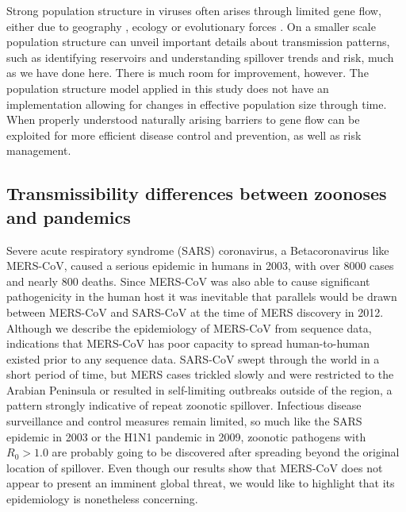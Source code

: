 \documentclass[9pt,lineno]{elife}
\begin{document}
Strong population structure in viruses often arises through limited gene flow, either due to geography \citep{dudas_virus_2017}, ecology \citep{smith_dating_2009} or evolutionary forces \citep{turner_genomic_2005,dudas_reassortment_2015}.
On a smaller scale population structure can unveil important details about transmission patterns, such as identifying reservoirs and understanding spillover trends and risk, much as we have done here.
There is much room for improvement, however.
The population structure model applied in this study does not have an implementation allowing for changes in effective population size through time.
When properly understood naturally arising barriers to gene flow can be exploited for more efficient disease control and prevention, as well as risk management.


\subsection*{Transmissibility differences between zoonoses and pandemics}
Severe acute respiratory syndrome (SARS) coronavirus, a Betacoronavirus like MERS-CoV, caused a serious epidemic in humans in 2003, with over 8000 cases and nearly 800 deaths.
Since MERS-CoV was also able to cause significant pathogenicity in the human host it was inevitable that parallels would be drawn between MERS-CoV and SARS-CoV at the time of MERS discovery in 2012.
Although we describe the epidemiology of MERS-CoV from sequence data, indications that MERS-CoV has poor capacity to spread human-to-human existed prior to any sequence data.
SARS-CoV swept through the world in a short period of time, but MERS cases trickled slowly and were restricted to the Arabian Peninsula or resulted in self-limiting outbreaks outside of the region, a pattern strongly indicative of repeat zoonotic spillover.
Infectious disease surveillance and control measures remain limited, so much like the SARS epidemic in 2003 or the H1N1 pandemic in 2009, zoonotic pathogens with $R_{0}>1.0$ are probably going to be discovered after spreading beyond the original location of spillover.
Even though our results show that MERS-CoV does not appear to present an imminent global threat, we would like to highlight that its epidemiology is nonetheless concerning.
\end{document}
